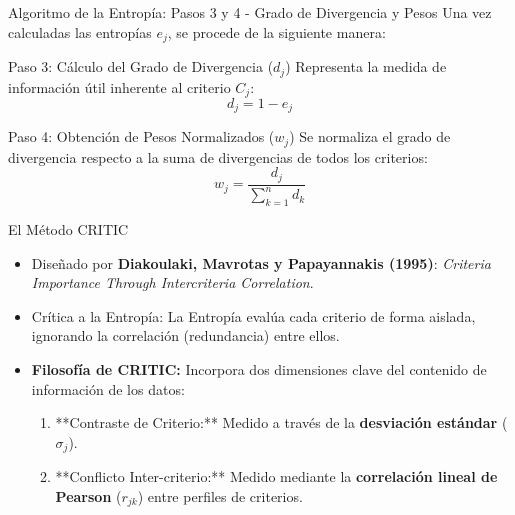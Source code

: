 \documentclass[aspectratio=169, 10pt]{beamer}
\begin{document}
\begin{frame}{Algoritmo de la Entropía: Pasos 3 y 4 - Grado de Divergencia y Pesos}
    Una vez calculadas las entropías $e_j$, se procede de la siguiente manera:
    
    \begin{block}{Paso 3: Cálculo del Grado de Divergencia ($d_j$)}
        Representa la medida de información útil inherente al criterio $C_j$:
        \[ d_j = 1 - e_j \]
    \end{block}
    
    \begin{block}{Paso 4: Obtención de Pesos Normalizados ($w_j$)}
        Se normaliza el grado de divergencia respecto a la suma de divergencias de todos los criterios:
        \[ w_j = \frac{d_j}{\sum_{k=1}^{n} d_k} \]
    \end{block}
\end{frame}

\begin{frame}{El Método CRITIC}
    \begin{itemize}
        \item Diseñado por \textbf{Diakoulaki, Mavrotas y Papayannakis (1995)}: \textit{Criteria Importance Through Intercriteria Correlation}.
        \item Crítica a la Entropía: La Entropía evalúa cada criterio de forma aislada, ignorando la correlación (redundancia) entre ellos.
        \item \textbf{Filosofía de CRITIC:} Incorpora dos dimensiones clave del contenido de información de los datos:
        \begin{enumerate}
            \item **Contraste de Criterio:** Medido a través de la \textbf{desviación estándar} ($\sigma_j$).
            \item **Conflicto Inter-criterio:** Medido mediante la \textbf{correlación lineal de Pearson} ($r_{jk}$) entre perfiles de criterios.
        \end{enumerate}
    \end{itemize}
\end{frame}
\end{document}
